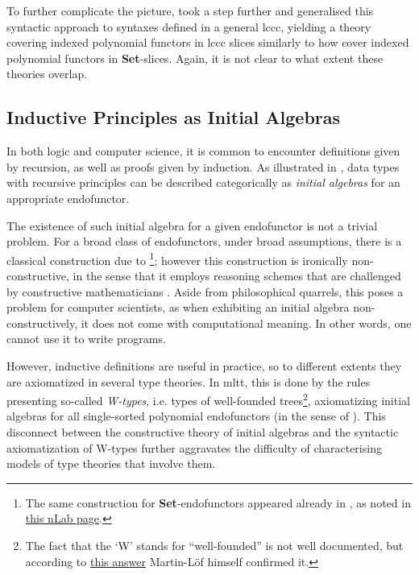 \documentclass[a4paper]{article}
\newcommand{\catname}[1]{{\normalfont\textbf{#1}}}
\newcommand{\Set}{\catname{Set}}
\begin{document}
To further complicate the picture, \textcite{Gambino2009} took a step further and generalised this syntactic approach to syntaxes defined in a general \gls{lccc}, yielding a theory covering indexed polynomial functors in \gls{lccc} slices similarly to how \cite{Altenkirch2015} cover indexed polynomial functors in \Set{}-slices. Again, it is not clear to what extent these theories overlap.

\subsection{Inductive Principles as Initial Algebras}

In both logic and computer science, it is common to encounter definitions given by recursion, as well as proofs given by induction. As illustrated in \cite[Section 10.5]{Awodey2010}, data types with recursive principles can be described categorically as \textit{initial algebras} for an appropriate endofunctor.

The existence of such initial algebra for a given endofunctor is not a trivial problem. For a broad class of endofunctors, under broad assumptions, there is a classical construction due to \textcite{Adamek1974}\footnote{The same construction for \Set{}-endofunctors appeared already in \textcite{Pohlova1973}, as noted in \href{https://ncatlab.org/nlab/show/Ad\%C3\%A1mek\%27s+fixed+point+theorem}{this nLab page}.}; however this construction is ironically non-constructive, in the sense that it employs reasoning schemes that are challenged by constructive mathematicians \cite[Theorem 1.1, discussion]{Pitts2021}. Aside from philosophical quarrels, this poses a problem for computer scientists, as when exhibiting an initial algebra non-constructively, it does not come with computational meaning. In other words, one cannot use it to write programs.

However, inductive definitions are useful in practice, so to different extents they are axiomatized in several type theories. In \gls{mltt}, this is done by the rules presenting so-called \textit{W-types}, i.e. types of well-founded trees\footnote{The fact that the `W' stands for ``well-founded'' is not well documented, but according to \href{https://mathoverflow.net/questions/402435/why-are-w-types-called-w}{this answer} Martin-Löf himself confirmed it.}, axiomatizing initial algebras for all single-sorted polynomial endofunctors (in the sense of \cite{Abbott2005}). This disconnect between the constructive theory of initial algebras and the syntactic axiomatization of W-types further aggravates the difficulty of characterising models of type theories that involve them.
\end{document}
